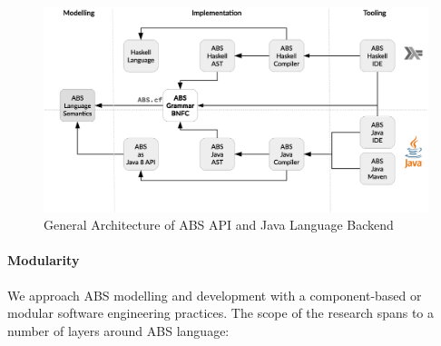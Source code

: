 \begin{figure}[t]
\centering
\includegraphics[scale=0.3]{../figs/Arch.eps}
\caption[General Architecture]{General Architecture of ABS API and Java Language Backend}
\label{fig:arch}
\end{figure}

\paragraph{Modularity} 
We approach ABS modelling and development with a component-based or modular 
software engineering practices.
The scope of the research spans to a number of layers around ABS language:

